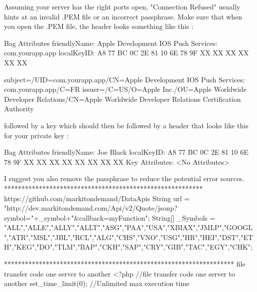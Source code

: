 {{{	

Assuming your server has the right ports open, "Connection Refused" usually hints at an invalid .PEM file or an incorrect passphrase. Make sure that when you open the .PEM file, the header looks something like this :

Bag Attributes
friendlyName: Apple Development IOS Push Services: com.yourapp.app
localKeyID: A8 77 BC 0C 2E 81 10 6E 78 9F XX XX XX XX XX XX

subject=/UID=com.yourapp.app/CN=Apple Development IOS Push Services: com.yourapp.app/C=FR issuer=/C=US/O=Apple Inc./OU=Apple Worldwide Developer Relations/CN=Apple Worldwide Developer Relations Certification Authority

followed by a key which should then be followed by a header that looks like this for your private key :

Bag Attributes
friendlyName: Joe Black
localKeyID: A8 77 BC 0C 2E 81 10 6E 78 9F XX XX XX XX XX XX XX XX
Key Attributes: <No Attributes>

I suggest you also remove the passphrase to reduce the potential error sources.
*********************************************************
https://github.com/markitondemand/DataApis
String url	              =   "http://dev.markitondemand.com/Api/v2/Quote/jsonp?symbol="+_symbol+"&callback=myFunction";
 	String[] _Symbols = {"ALL","ALLE","ALLY","ALLT","ASG","PAA","USA","XBIAX","JMLP","GOOGL","ATR","MSL","JBL","RCL","ALG","CHS","VNO","USG","HR","HEI","DST","ETH","KEG","DO","TLM","BAP","CKH","SAP","CRY","GIB","TAC","EGY","CHK"};

******************************************************************
file transfer code one server to another
<?php
//file transfer code one server to another
set_time_limit(0); //Unlimited max execution time
 
}}}
